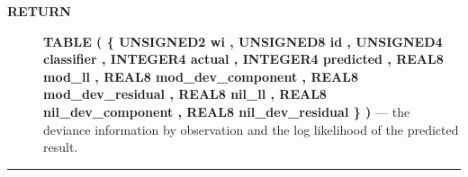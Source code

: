 \par
\begin{description}
\item [\colorbox{tagtype}{\color{white} \textbf{\textsf{RETURN}}}] \textbf{TABLE ( \{ UNSIGNED2 wi , UNSIGNED8 id , UNSIGNED4 classifier , INTEGER4 actual , INTEGER4 predicted , REAL8 mod\_ll , REAL8 mod\_dev\_component , REAL8 mod\_dev\_residual , REAL8 nil\_ll , REAL8 nil\_dev\_component , REAL8 nil\_dev\_residual \} )} --- the deviance information by observation and the log likelihood of the predicted result.
\end{description}




\rule{\linewidth}{0.5pt}
